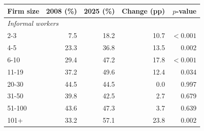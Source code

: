 \begin{tabular}{lrrrr}
\toprule
    Firm size & 2008 (\%) & 2025 (\%) & Change (pp) & $p$-value \\
    \midrule
\multicolumn{5}{l}{\textit{Informal workers}} \\
2-3 & 7.5 & 18.2 & 10.7 & $<0.001$ \\
4-5 & 23.3 & 36.8 & 13.5 & 0.002 \\
6-10 & 29.4 & 47.2 & 17.8 & $<0.001$ \\
11-19 & 37.2 & 49.6 & 12.4 & 0.034 \\
20-30 & 44.5 & 44.5 & 0.0 & 0.997 \\
31-50 & 39.8 & 42.5 & 2.7 & 0.679 \\
51-100 & 43.6 & 47.3 & 3.7 & 0.639 \\
101+ & 33.2 & 57.1 & 23.8 & 0.002\\
\bottomrule\end{tabular}
